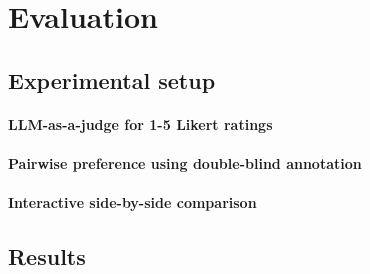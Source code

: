 \section{Evaluation}
\subsection{Experimental setup}

\paragraph{LLM-as-a-judge for 1-5 Likert ratings}

\paragraph{Pairwise preference using double-blind annotation}

\paragraph{Interactive side-by-side comparison}

\subsection{Results}
